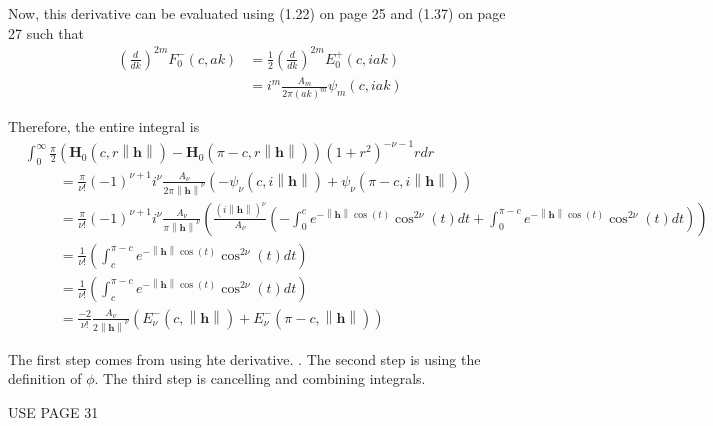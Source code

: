 \documentclass[11pt]{article}
\begin{document}
\pagebreak



Now, this derivative can be evaluated using (1.22) on page 25 and (1.37) on page 27 such that \begin{align*}
\left(\frac{d}{dk}\right)^{2m} F_0^-(c,ak) &=\frac{1}{2} \left(\frac{d}{dk}\right)^{2m} E_0^+(c, iak)  \\
&=i^{m} \frac{A_m}{2\pi (ak)^m} \psi_{m}(c, iak)
\end{align*}

Therefore, the entire integral is \begin{align*}
 &\int_0^\infty \frac{\pi}{2}\left(\boldsymbol{H}_{0}(c, r\left\lVert \boldsymbol{h}\right\rVert) - \boldsymbol{H}_{0}(\pi - c, r\left\lVert \boldsymbol{h}\right\rVert)\right) (1+r^2)^{-\nu-1} r dr \\
 &\ \ \ \ \ \ \ \ \ \ \ = \frac{\pi}{\nu!}(-1)^{\nu + 1} i^\nu \frac{A_\nu}{2\pi \left\lVert \boldsymbol{h}\right\rVert^\nu} \left(-\psi_\nu(c, i\left\lVert \boldsymbol{h}\right\rVert) + \psi_\nu(\pi-c, i\left\lVert \boldsymbol{h}\right\rVert)  \right)\\
 &\ \ \ \ \ \ \ \ \ \ \ = \frac{\pi}{\nu!}(-1)^{\nu + 1} i^\nu \frac{A_\nu}{\pi \left\lVert \boldsymbol{h}\right\rVert^\nu} \left(\frac{(i\left\lVert \boldsymbol{h}\right\rVert)^\nu}{A_\nu} \left(-\int_0^c e^{-\left\lVert \boldsymbol{h}\right\rVert \cos (t)} \cos^{2\nu} (t) dt + \int_0^{\pi - c} e^{-\left\lVert \boldsymbol{h}\right\rVert \cos (t)} \cos^{2\nu} (t) dt  \right)\right)\\
 &\ \ \ \ \ \ \ \ \ \ \ = \frac{1}{\nu!} \left(\int_c^{\pi-c} e^{-\left\lVert \boldsymbol{h}\right\rVert \cos (t)} \cos^{2\nu} (t) dt  \right)\\
  &\ \ \ \ \ \ \ \ \ \ \ = \frac{1}{\nu!} \left(\int_c^{\pi-c} e^{-\left\lVert \boldsymbol{h}\right\rVert \cos (t)} \cos^{2\nu} (t) dt  \right)\\
 &\ \ \ \ \ \ \ \ \ \ \ = \frac{-2}{\nu!} \frac{A_\nu}{2\left\lVert \boldsymbol{h}\right\rVert^\nu}  \left(E_\nu^-(c,  \left\lVert \boldsymbol{h}\right\rVert) + E_\nu^-(\pi - c,  \left\lVert \boldsymbol{h}\right\rVert) \right)
 \end{align*}

The first step comes from using hte derivative. . The second step is using the definition of $\phi$. The third step is cancelling and combining integrals. 

USE PAGE 31
\end{document}
